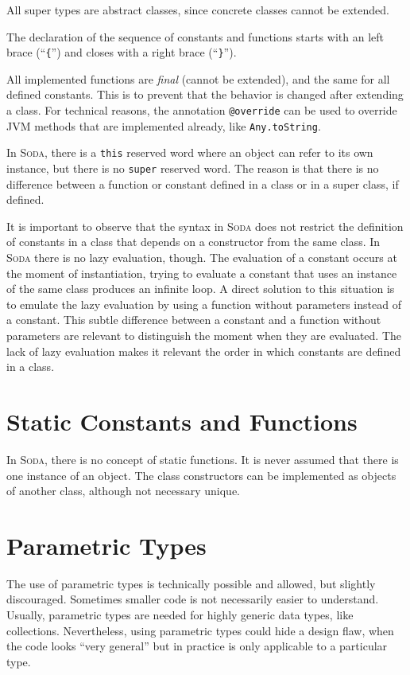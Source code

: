 \documentclass[12pt,a4paper]{book}
\makeatletter
\newcommand{\srccode}[1]{\texttt{{#1}}}
\newcommand{\reservedWord}[1]{{\color{blue}\srccode{#1}}\xspace}
\newcommand{\annotation}[1]{{\color{brown}\srccode{#1}}\xspace}
\newcommand{\sthis}{\reservedWord{this}}
\newcommand{\soverride}{\annotation{@override}}
\newcommand{\Soda}{\textsc{Soda}\xspace}
\makeatother
\begin{document}
    All super types are abstract classes, since concrete classes cannot be extended.

    The declaration of the sequence of constants and functions starts with an left brace (``\srccode{\{}'') and closes with a right brace (``\srccode{\}}'').

    All implemented functions are \textit{final} (cannot be extended), and the same for all defined constants.
    This is to prevent that the behavior is changed after extending a class.
    For technical reasons, the annotation \soverride can be used to override JVM methods that are implemented already, like \srccode{Any.toString}.

    In \Soda, there is a \sthis reserved word where an object can refer to its own instance, but there is no \srccode{super} reserved word.
    The reason is that there is no difference between a function or constant defined in a class or in a super class, if defined.

    It is important to observe that the syntax in \Soda does not restrict the definition of constants in a class that depends on a constructor from the same class.
    In \Soda there is no lazy evaluation, though.
    The evaluation of a constant occurs at the moment of instantiation, trying to evaluate a constant that uses an instance of the same class produces an infinite loop.
    A direct solution to this situation is to emulate the lazy evaluation by using a function without parameters instead of a constant.
    This subtle difference between a constant and a function without parameters are relevant to distinguish the moment when they are evaluated.
    The lack of lazy evaluation makes it relevant the order in which constants are defined in a class.


    \section{Static Constants and Functions}

    In \Soda, there is no concept of static functions.
    It is never assumed that there is one instance of an object.
    The class constructors can be implemented as objects of another class, although not necessary unique.


    \section{Parametric Types}

    The use of parametric types is technically possible and allowed, but slightly discouraged.
    Sometimes smaller code is not necessarily easier to understand.
    Usually, parametric types are needed for highly generic data types, like collections.
    Nevertheless, using parametric types could hide a design flaw, when the code looks ``very general'' but in practice is only applicable to a particular type.
\end{document}
